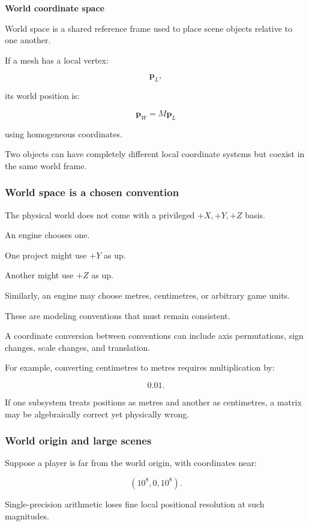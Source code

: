 \textbf{World coordinate space}

World space is a shared reference frame used to place scene objects relative to one another.

If a mesh has a local vertex:

\[
 \mathbf p_L,
\]

its world position is:

\[
 \mathbf p_W=M\mathbf p_L
\]

using homogeneous coordinates.

Two objects can have completely different local coordinate systems but coexist in the same world frame.

\subsubsection{World space is a chosen convention}\label{02-foundations-ii-ch032-world-space-is-a-chosen-convention}

The physical world does not come with a privileged \(+X,+Y,+Z\) basis.

An engine chooses one.

One project might use \(+Y\) as up.

Another might use \(+Z\) as up.

Similarly, an engine may choose metres, centimetres, or arbitrary game units.

These are modeling conventions that must remain consistent.

A coordinate conversion between conventions can include axis permutations, sign changes, scale changes, and translation.

For example, converting centimetres to metres requires multiplication by:

\[
 0.01.
\]

If one subsystem treats positions as metres and another as centimetres, a matrix may be algebraically correct yet physically wrong.

\subsubsection{World origin and large scenes}\label{02-foundations-ii-ch032-world-origin-and-large-scenes}

Suppose a player is far from the world origin, with coordinates near:

\[
 (10^8,0,10^8).
\]

Single-precision arithmetic loses fine local positional resolution at such magnitudes.

